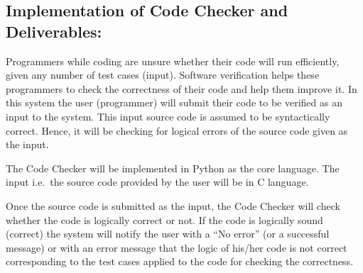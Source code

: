 \subsection{Implementation of Code Checker and
Deliverables:}\label{implementation-of-code-checker-and-deliverables}

Programmers while coding are unsure whether their code will run
efficiently, given any number of test cases (input). Software
verification helps these programmers to check the correctness of their
code and help them improve it. In this system the user (programmer) will
submit their code to be verified as an input to the system. This input
source code is assumed to be syntactically correct. Hence, it will be
checking for logical errors of the source code given as the input.

The Code Checker will be implemented in Python as the core language. The
input i.e.~the source code provided by the user will be in C language.

Once the source code is submitted as the input, the Code Checker will
check whether the code is logically correct or not. If the code is
logically sound (correct) the system will notify the user with a ``No
error'' (or a successful message) or with an error message that the
logic of his/her code is not correct corresponding to the test cases
applied to the code for checking the correctness.

